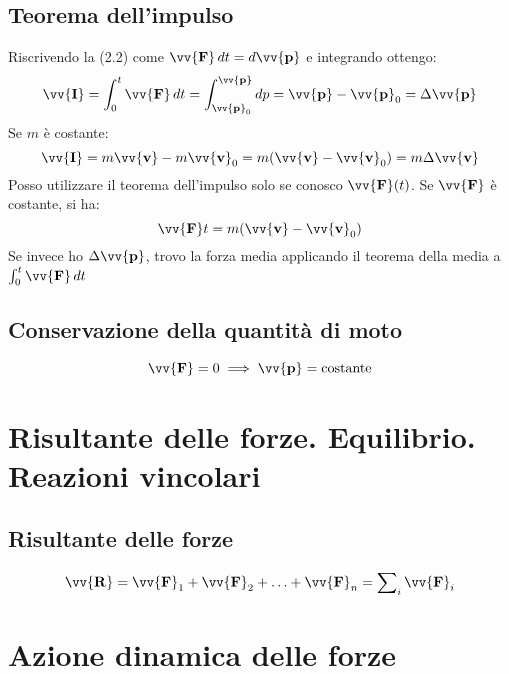 \documentclass{report}
\newcommand{\vett}[1]{\vv{\boldsymbol{\mathbf{#1}}}}
\begin{document}
\subsection{Teorema dell'impulso}
Riscrivendo la (2.2) come \(\vett{F}\,dt = d\vett{p}\) e integrando ottengo:
\begin{equation}
    \vett{I} = \int_{0}^{t}\vett{F}\,dt = \int_{\vett{p}_0}^{\vett{p}}dp
    = \vett{p} - \vett{p}_0 = \Delta\vett{p}
\end{equation}
Se \(m\) è costante:
\begin{equation*}
    \vett{I} = m\vett{v} - m\vett{v}_0 = m(\vett{v} - \vett{v}_0) = m\Delta\vett{v}
\end{equation*}
Posso utilizzare il teorema dell'impulso solo se conosco \(\vett{F}(t)\).
Se \(\vett{F}\) è costante, si ha:
\begin{equation*}
    \vett{F}t = m(\vett{v} - \vett{v}_0)
\end{equation*}
Se invece ho \(\Delta\vett{p}\), trovo la forza media applicando il 
teorema della media a \(\int_{0}^{t}\vett{F}\,dt\)

\subsection{Conservazione della quantità di moto}
\begin{equation*}
    \vett{F} = 0 \implies \vett{p} = \text{costante}
\end{equation*}

\section{Risultante delle forze. Equilibrio. Reazioni vincolari}
\subsection{Risultante delle forze}
\begin{equation*}
    \vett{R} = \vett{F}_1 + \vett{F}_2 + \ldots + \vett{F}_n = \sum\nolimits_i \vett{F}_i
\end{equation*}



\section{Azione dinamica delle forze}
\end{document}
